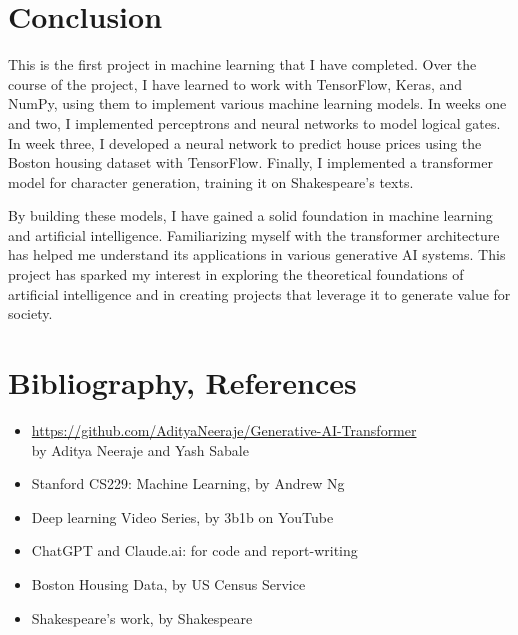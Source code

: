\documentclass[12pt,a4paper]{article}
\begin{document}
\section{Conclusion}
This is the first project in machine learning that I have completed. Over the course of the project, I have learned to work with TensorFlow, Keras, and NumPy, using them to implement various machine learning models. In weeks one and two, I implemented perceptrons and neural networks to model logical gates.
In week three, I developed a neural network to predict house prices using the Boston housing dataset with TensorFlow. Finally, I implemented a transformer model for character generation, training it on Shakespeare's texts.

By building these models, I have gained a solid foundation in machine learning and artificial intelligence. Familiarizing myself with the transformer architecture has helped me understand its applications in various generative AI systems.  This project has sparked my interest in exploring the theoretical foundations of artificial intelligence and in creating projects that leverage it to generate value for society.

\section{Bibliography, References}
\begin{itemize}
\item \url{https://github.com/AdityaNeeraje/Generative-AI-Transformer}  \\ by Aditya Neeraje and Yash Sabale
\item Stanford CS229: Machine Learning, by Andrew Ng
\item Deep learning Video Series, by 3b1b on YouTube
\item ChatGPT and Claude.ai: for code and report-writing
\item Boston Housing Data, by US Census Service
\item Shakespeare's work, by Shakespeare
\end{itemize}
\end{document}
